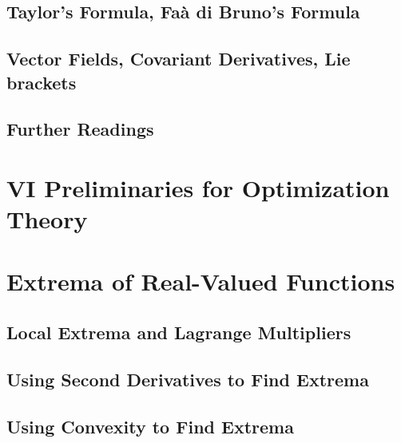 \documentclass[a4paper]{article}
\begin{document}
\subsection{ Taylor's Formula, Faà di Bruno's Formula} %

\subsection{ Vector Fields, Covariant Derivatives, Lie brackets} %

\subsection{ Further Readings} %


\newpage
\section*{VI Preliminaries for Optimization Theory}
\section{Extrema of Real-Valued Functions}
\subsection{ Local Extrema and Lagrange Multipliers} %

\subsection{ Using Second Derivatives to Find Extrema} %

\subsection{ Using Convexity to Find Extrema} %
\end{document}

